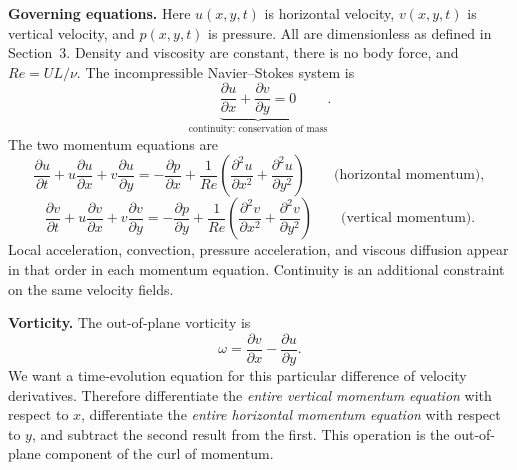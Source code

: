 \label{sec:transport}
\textbf{Governing equations.} Here $u(x,y,t)$ is horizontal velocity, $v(x,y,t)$ is vertical velocity, and $p(x,y,t)$ is pressure. All are dimensionless as defined in Section~3. Density and viscosity are constant, there is no body force, and $Re=UL/\nu$. The incompressible Navier--Stokes system is
\begin{equation*}
\underbrace{\frac{\partial u}{\partial x}+\frac{\partial v}{\partial y}=0}_{\text{continuity: conservation of mass}}.
\end{equation*}
The two momentum equations are
\begin{equation*}
\frac{\partial u}{\partial t}
+u\frac{\partial u}{\partial x}+v\frac{\partial u}{\partial y}
=-\frac{\partial p}{\partial x}
+\frac{1}{Re}\left(\frac{\partial^2u}{\partial x^2}+\frac{\partial^2u}{\partial y^2}\right)
\qquad\text{(horizontal momentum)},
\end{equation*}
\begin{equation*}
\frac{\partial v}{\partial t}
+u\frac{\partial v}{\partial x}+v\frac{\partial v}{\partial y}
=-\frac{\partial p}{\partial y}
+\frac{1}{Re}\left(\frac{\partial^2v}{\partial x^2}+\frac{\partial^2v}{\partial y^2}\right)
\qquad\text{(vertical momentum)}.
\end{equation*}
Local acceleration, convection, pressure acceleration, and viscous diffusion appear in that order in each momentum equation. Continuity is an additional constraint on the same velocity fields.

\textbf{Vorticity.} The out-of-plane vorticity is
\[
\omega=\frac{\partial v}{\partial x}-\frac{\partial u}{\partial y}.
\]
We want a time-evolution equation for this particular difference of velocity derivatives. Therefore differentiate the \emph{entire vertical momentum equation} with respect to $x$, differentiate the \emph{entire horizontal momentum equation} with respect to $y$, and subtract the second result from the first. This operation is the out-of-plane component of the curl of momentum.

